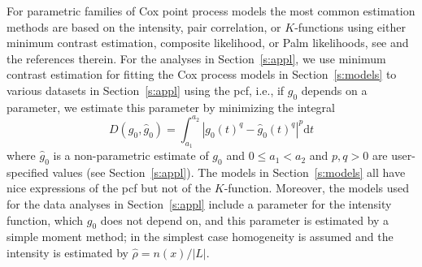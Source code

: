 \documentclass[alpha-refs]{wiley-article}
\begin{document}
For parametric families of Cox point process models the most common estimation methods are based on the intensity, pair correlation, or $K$-functions using either minimum contrast estimation, composite likelihood, or Palm likelihoods, see \citet[][]{MW07,MW17} and the references therein. For the analyses in Section~\ref{s:appl}, we use minimum contrast estimation for fitting the Cox process models in Section~\ref{s:models} to various datasets in Section~\ref{s:appl} using the pcf, i.e., if $g_0$ depends on a parameter, we estimate this parameter by minimizing the integral
\begin{equation}\label{e:contrast}
D(g_0,\hat g_0) = \int_{a_1}^{a_2} \left|g_0(t)^q-\hat{g}_0(t)^q\right|^p \mathrm{d}t
\end{equation}
where $\hat g_0$ is a non-parametric estimate of $g_0$ \citep[see e.g.\ (31) in][]{RakshitEtAl} and $0\leq a_1 < a_2$ and $p,q>0$ are user-specified values (see Section~\ref{s:appl}). The models in Section~\ref{s:models} all have nice expressions of the pcf but not of the $K$-function. Moreover, the models used for the data analyses in Section~\ref{s:appl} include a parameter for the intensity function, which $g_0$ does not depend on, and this parameter is estimated by a simple moment method; in the simplest case homogeneity is assumed and the intensity is estimated by $\hat{\rho}={n(x)}/{|L|}$. 
\end{document}
